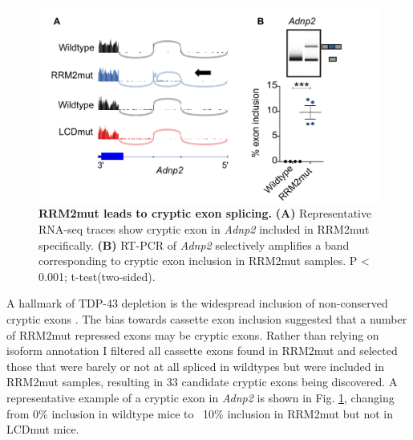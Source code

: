 \begin{figure}[h!]
	\centering
	\includegraphics[width=14cm]{Figures/05_tdp_mice/cryptic_exon_multi.png}
	\caption[RRM2mut leads to cryptic exon splicing]{
		\textbf{RRM2mut leads to cryptic exon splicing.}
	\label{cryptic_multi}
	\textbf{(A)} Representative RNA-seq traces show cryptic exon in \textit{Adnp2} included in RRM2mut specifically. 
	\textbf{(B)} RT-PCR of \textit{Adnp2} selectively amplifies a band corresponding to cryptic exon inclusion in RRM2mut samples. P < 0.001; t-test(two-sided).
}
\end{figure}

A hallmark of TDP-43 depletion is the widespread inclusion of non-conserved cryptic exons \citep{Ling2015}. The bias towards cassette exon inclusion suggested that a number of RRM2mut repressed exons may be cryptic exons. Rather than relying on isoform annotation I filtered all cassette exons found in RRM2mut and selected those that were barely or not at all spliced in wildtypes but were included in RRM2mut samples, resulting in 33 candidate cryptic exons being discovered. A representative example of a cryptic exon in \textit{Adnp2} is shown in Fig. \ref{cryptic_multi}, changing from 0\% inclusion in wildtype mice to ~10\% inclusion in RRM2mut but not in LCDmut mice.  

